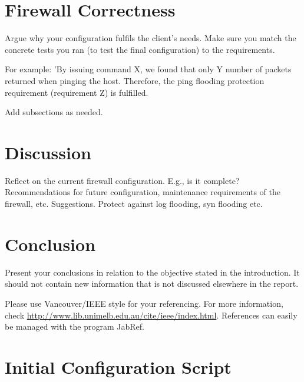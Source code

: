 \documentclass[a4paper,12pt]{report}
\begin{document}
% 

\newpage



\chapter{Firewall Correctness}
\label{ch:correctness}

{\color{red}
  Argue why your configuration fulfils the client's needs. Make sure you match the concrete tests you ran (to test the final configuration) to the requirements.
  
  For example: 'By issuing command X, we found that only Y number of packets returned when pinging the host. Therefore, the ping flooding protection requirement (requirement Z) is fulfilled.

  Add subsections as needed.
}

\chapter{Discussion}
\label{ch:discussion}

{\color{red}
Reflect on the current firewall configuration. E.g., is it complete? Recommendations for future configuration, maintenance requirements of the firewall, etc.
}
Suggestions. Protect against log flooding, syn flooding etc.

\chapter{Conclusion}
\label{ch:conclusion}

{\color{red}
Present your conclusions in relation to the objective stated in the introduction. It should not contain new information that is not discussed elsewhere in the report. 
}





{\color{red}
Please use Vancouver/IEEE style for your referencing. For more information, check \url{http://www.lib.unimelb.edu.au/cite/ieee/index.html}. References can easily be managed with the program JabRef.
}

\appendix
\appendixpage

\chapter{Initial Configuration Script}
\label{app:fw-initial}
\end{document}
